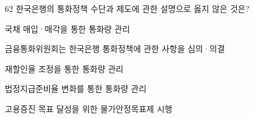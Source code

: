 \begin{question}{62}
한국은행의 통화정책 수단과 제도에 관한 설명으로 옳지 않은 것은?
\begin{choices}
  \item 국채 매입·매각을 통한 통화량 관리
  \item 금융통화위원회는 한국은행 통화정책에 관한 사항을 심의·의결
  \item 재할인율 조정을 통한 통화량 관리
  \item 법정지급준비율 변화를 통한 통화량 관리
  \item 고용증진 목표 달성을 위한 물가안정목표제 시행
\end{choices}
\end{question}
